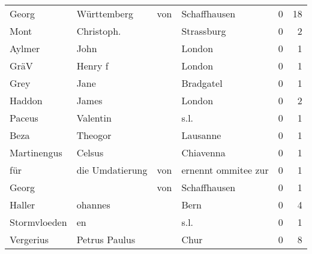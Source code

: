 \begin{tabular}{llllrr}
                    Georg &                        Württemberg &         von &                                Schaffhausen &          0 &        18 \\
                     Mont &                         Christoph. &             &                                  Strassburg &          0 &         2 \\
                   Aylmer &                               John &             &                                      London &          0 &         1 \\
                     GräV &                            Henry f &             &                                      London &          0 &         1 \\
                     Grey &                               Jane &             &                                   Bradgatel &          0 &         1 \\
                   Haddon &                              James &             &                                      London &          0 &         2 \\
                   Paceus &                           Valentin &             &                                        s.l. &          0 &         1 \\
                     Beza &                            Theogor &             &                                    Lausanne &          0 &         1 \\
              Martinengus &                             Celsus &             &                                   Chiavenna &          0 &         1 \\
                      für &                    die Umdatierung &         von &                         ernennt ommitee zur &          0 &         1 \\
                    Georg &                                    &         von &                                Schaffhausen &          0 &         1 \\
                   Haller &                            ohannes &             &                                        Bern &          0 &         4 \\
             Stormvloeden &                                 en &             &                                        s.l. &          0 &         1 \\
                Vergerius &                      Petrus Paulus &             &                                        Chur &          0 &         8 \\

\end{tabular}
